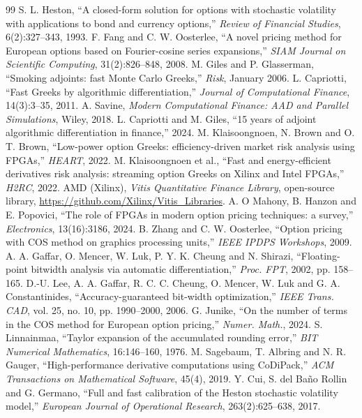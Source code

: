 \documentclass[11pt,a4paper]{article}
\begin{document}
\begin{thebibliography}{99}
\small
{} S. L. Heston, ``A closed-form solution for options with stochastic
volatility with applications to bond and currency options,'' \emph{Review of Financial
Studies}, 6(2):327--343, 1993.
 F. Fang and C. W. Oosterlee, ``A novel pricing method for European
options based on Fourier-cosine series expansions,'' \emph{SIAM Journal on Scientific
Computing}, 31(2):826--848, 2008.
 M. Giles and P. Glasserman, ``Smoking adjoints: fast Monte Carlo
Greeks,'' \emph{Risk}, January 2006.
 L. Capriotti, ``Fast Greeks by algorithmic differentiation,''
\emph{Journal of Computational Finance}, 14(3):3--35, 2011.
 A. Savine, \emph{Modern Computational Finance: AAD and Parallel
Simulations}, Wiley, 2018.
 L. Capriotti and M. Giles, ``15 years of adjoint algorithmic
differentiation in finance,'' 2024.
 M. Klaisoongnoen, N. Brown and O. T. Brown, ``Low-power option Greeks:
efficiency-driven market risk analysis using FPGAs,'' \emph{HEART}, 2022.
 M. Klaisoongnoen et al., ``Fast and energy-efficient derivatives risk
analysis: streaming option Greeks on Xilinx and Intel FPGAs,'' \emph{H2RC}, 2022.
 AMD (Xilinx), \emph{Vitis Quantitative Finance Library}, open-source
library, \url{https://github.com/Xilinx/Vitis_Libraries}.
 A. O Mahony, B. Hanzon and E. Popovici, ``The role of FPGAs in modern
option pricing techniques: a survey,'' \emph{Electronics}, 13(16):3186, 2024.
 B. Zhang and C. W. Oosterlee, ``Option pricing with COS method on
graphics processing units,'' \emph{IEEE IPDPS Workshops}, 2009.
 A. A. Gaffar, O. Mencer, W. Luk, P. Y. K. Cheung and N. Shirazi,
``Floating-point bitwidth analysis via automatic differentiation,'' \emph{Proc. FPT}, 2002, pp. 158--165.
 D.-U. Lee, A. A. Gaffar, R. C. C. Cheung, O. Mencer, W. Luk and G. A. Constantinides,
``Accuracy-guaranteed bit-width optimization,'' \emph{IEEE Trans. CAD}, vol. 25, no. 10, pp. 1990--2000, 2006.
 G. Junike, ``On the number of terms in the COS method for European option pricing,''
\emph{Numer. Math.}, 2024.
 S. Linnainmaa, ``Taylor expansion of the accumulated rounding
error,'' \emph{BIT Numerical Mathematics}, 16:146--160, 1976.
 M. Sagebaum, T. Albring and N. R. Gauger, ``High-performance
derivative computations using CoDiPack,'' \emph{ACM Transactions on Mathematical
Software}, 45(4), 2019.
 Y. Cui, S. del Ba\~no Rollin and G. Germano, ``Full and fast calibration
of the Heston stochastic volatility model,'' \emph{European Journal of Operational
Research}, 263(2):625--638, 2017.
\end{thebibliography}
\end{document}
